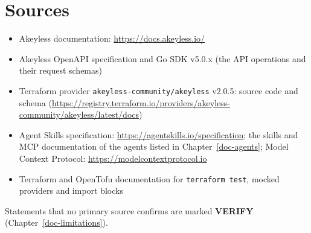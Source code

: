 \chapter{Sources}\label{app:sources}
\begin{itemize}
\item Akeyless documentation: \url{https://docs.akeyless.io/}
\item Akeyless OpenAPI specification and Go SDK v5.0.x (the API operations and their request schemas)
\item Terraform provider \texttt{akeyless-community/akeyless} v2.0.5: source code and schema
  (\url{https://registry.terraform.io/providers/akeyless-community/akeyless/latest/docs})
\item Agent Skills specification: \url{https://agentskills.io/specification}; the skills and MCP documentation of
  the agents listed in Chapter~\ref{doc-agents}; Model Context Protocol: \url{https://modelcontextprotocol.io}
\item Terraform and OpenTofu documentation for \texttt{terraform test}, mocked providers and import blocks
\end{itemize}
Statements that no primary source confirms are marked \textbf{VERIFY} (Chapter~\ref{doc-limitations}).
